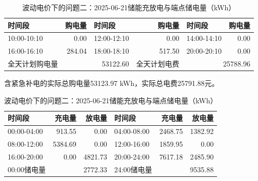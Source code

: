 \begin{table}[H]\centering\small\setlength{\tabcolsep}{5pt}
\caption{波动电价下的问题二：2025-06-21购电结果（电量：kWh；费用：元）}
\begin{tabular}{lrlrlr}\toprule
时间段 & 购电量 & 时间段 & 购电量 & 时间段 & 购电量 \\\midrule
10:00-10:10 & 0.00 & 12:00-12:10 & 0.00 & 14:00-14:10 & 0.00\\
16:00-16:10 & 284.04 & 18:00-18:10 & 517.50 & 20:00-20:10 & 0.00\\
\midrule 全天计划购电量 & \multicolumn{2}{r}{53122.60} & 全天计划电费 & \multicolumn{2}{r}{25788.96}\\\bottomrule
\end{tabular}
\par\vspace{2pt}\footnotesize
含紧急补电的实际总购电量53123.97 kWh，实际总电费25791.88元。
\vspace{3pt}\small
\caption{波动电价下的问题二：2025-06-21储能充放电与端点储电量（kWh）}
\begin{tabular}{lrrlrr}\toprule
时间段 & 充电量 & 放电量 & 时间段 & 充电量 & 放电量 \\\midrule
00:00-04:00 & 913.55 & 0.00 & 04:00-08:00 & 2468.75 & 1382.92\\
08:00-12:00 & 5384.69 & 0.00 & 12:00-16:00 & 1859.95 & 0.00\\
16:00-20:00 & 0.00 & 4821.73 & 20:00-24:00 & 7617.18 & 2485.90\\
\midrule 00:00储电量 & \multicolumn{2}{r}{2772.33} & 24:00储电量 & \multicolumn{2}{r}{9535.88}\\\bottomrule
\end{tabular}\end{table}
